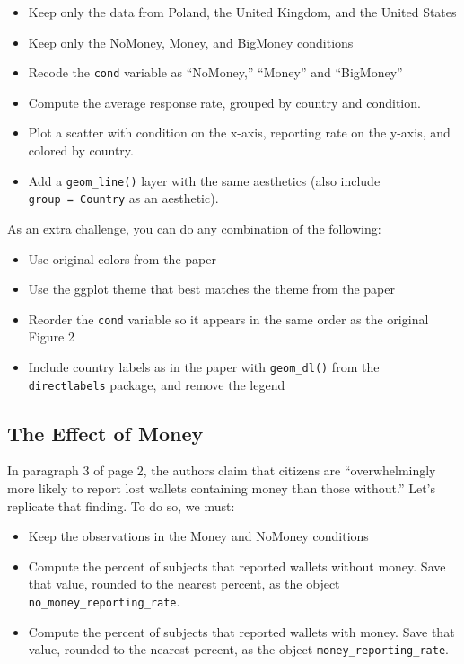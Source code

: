 \documentclass[12pt,halfline,a4paper,]{ouparticle}
\providecommand{\tightlist}{%
  \setlength{\itemsep}{0pt}\setlength{\parskip}{0pt}}
\begin{document}
\begin{itemize}
\tightlist
\item
  Keep only the data from Poland, the United Kingdom, and the United
  States
\item
  Keep only the NoMoney, Money, and BigMoney conditions
\item
  Recode the \texttt{cond} variable as ``NoMoney,'' ``Money'' and
  ``BigMoney''
\item
  Compute the average response rate, grouped by country and condition.
\item
  Plot a scatter with condition on the x-axis, reporting rate on the
  y-axis, and colored by country.
\item
  Add a \texttt{geom\_line()} layer with the same aesthetics (also
  include \texttt{group\ =\ Country} as an aesthetic).
\end{itemize}

\noindent As an extra challenge, you can do any combination of the
following:

\begin{itemize}
\tightlist
\item
  Use original colors from the paper
\item
  Use the ggplot theme that best matches the theme from the paper
\item
  Reorder the \texttt{cond} variable so it appears in the same order as
  the original Figure 2
\item
  Include country labels as in the paper with \texttt{geom\_dl()} from
  the \texttt{directlabels} package, and remove the legend
\end{itemize}

\hypertarget{the-effect-of-money}{%
\subsection{The Effect of Money}\label{the-effect-of-money}}

In paragraph 3 of page 2, the authors claim that citizens are
``overwhelmingly more likely to report lost wallets containing money
than those without.'' Let's replicate that finding. To do so, we must:

\begin{itemize}
\tightlist
\item
  Keep the observations in the Money and NoMoney conditions
\item
  Compute the percent of subjects that reported wallets without money.
  Save that value, rounded to the nearest percent, as the object
  \texttt{no\_money\_reporting\_rate}.
\item
  Compute the percent of subjects that reported wallets with money. Save
  that value, rounded to the nearest percent, as the object
  \texttt{money\_reporting\_rate}.
\end{itemize}
\end{document}
